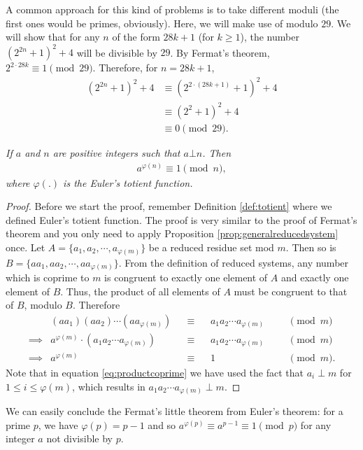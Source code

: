 \documentclass{subfile}
\begin{document}
		\begin{solution}
			A common approach for this kind of problems is to take different moduli (the first ones would be primes, obviously). Here, we will make use of modulo $29$. We will show that for any $n$ of the form $28k+1$ (for $k \geq 1$), the number $(2^{2n}+1 )^2+4$ will be divisible by $29$. By Fermat's theorem, $2^{2 \cdot 28k} \equiv 1 \pmod{29}$. Therefore, for $n=28k+1$,
				\begin{align*}
					(2^{2n}+1 )^2+4 &\equiv (2^{2\cdot (28k+1)}+1 )^2+4\\
									&\equiv (2^{2}+1 )^2+4\\
									&\equiv 0 \pmod{29}.
				\end{align*}

		\end{solution}

		\begin{theorem}\slshape
			If $a$ and $n$ are positive integers such that $a \bot n$. Then
			\begin{align*}
			a^{\varphi(n)} \equiv 1 \pmod n,
			\end{align*}
			where $\varphi(.)$ is the Euler's totient function.
		\end{theorem}

		\begin{proof}
			Before we start the proof, remember Definition \ref{def:totient} where we defined Euler's totient function. The proof is very similar to the proof of Fermat's theorem and you only need to apply Proposition \ref{prop:generalreducedsystem} once. Let $A=\{a_1, a_2, \cdots, a_{\varphi(m)}\}$ be a reduced residue set mod $m$. Then so is $B=\{aa_1, aa_2, \cdots, aa_{\varphi(m)}\}$. From the definition of reduced systems, any number which is coprime to $m$ is congruent to exactly one element of $A$ and exactly one element of $B$. Thus, the product of all elements of $A$ must be congruent to that of $B$, modulo $B$. Therefore
			\begin{align}
			& (aa_1) (aa_2) \cdots (aa_{\varphi(m)}) && \equiv && a_1 a_2 \cdots a_{\varphi(m)} &&&  \pmod m\nonumber\\
			\implies & a^{\varphi(m)} \cdot \left( a_1 a_2 \cdots a_{\varphi(m)}\right) && \equiv && a_1 a_2 \cdots a_{\varphi(m)} &&&  \pmod m\nonumber\\
			\label{eq:productcoprime}\implies & a^{\varphi(m)} && \equiv && 1 &&& \pmod m.
			\end{align}
			Note that in equation \eqref{eq:productcoprime} we have used the fact that $a_i \perp m$ for $1 \leq i \leq \varphi(m)$, which results in $a_1 a_2 \cdots a_{\varphi(m)} \perp m$.
		\end{proof}
	We can easily conclude the Fermat's little theorem from Euler's theorem: for a prime $p$, we have $\varphi(p)=p-1$ and so $a^{\varphi(p)} \equiv a^{p-1} \equiv 1 \pmod p$ for any integer $a$ not divisible by $p$.
\end{document}
